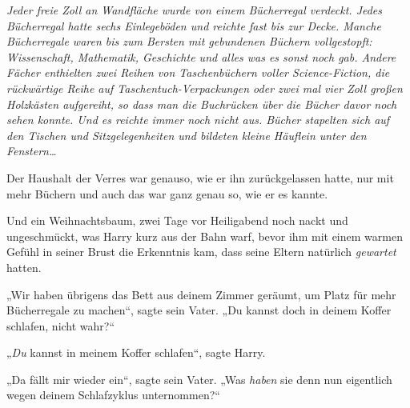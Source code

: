 \emph{Jeder freie Zoll an Wandfläche wurde von einem Bücherregal verdeckt. Jedes Bücherregal hatte sechs Einlegeböden und reichte fast bis zur Decke. Manche Bücherregale waren bis zum Bersten mit gebundenen Büchern vollgestopft: Wissenschaft, Mathematik, Geschichte und alles was es sonst noch gab. Andere Fächer enthielten zwei Reihen von Taschenbüchern voller Science-Fiction, die rückwärtige Reihe auf Taschentuch-Verpackungen oder zwei mal vier Zoll großen Holzkästen aufgereiht, so dass man die Buchrücken über die Bücher davor noch sehen konnte. Und es reichte immer noch nicht aus. Bücher stapelten sich auf den Tischen und Sitzgelegenheiten und bildeten kleine Häuflein unter den Fenstern…}

Der Haushalt der Verres war genauso, wie er ihn zurückgelassen hatte, nur mit mehr Büchern und auch das war ganz genau so, wie er es kannte.

Und ein Weihnachtsbaum, zwei Tage vor Heiligabend noch nackt und ungeschmückt, was Harry kurz aus der Bahn warf, bevor ihm mit einem warmen Gefühl in seiner Brust die Erkenntnis kam, dass seine Eltern natürlich \emph{gewartet} hatten.

„Wir haben übrigens das Bett aus deinem Zimmer geräumt, um Platz für mehr Bücherregale zu machen“, sagte sein Vater.
„Du kannst doch in deinem Koffer schlafen, nicht wahr?“

„\emph{Du} kannst in meinem Koffer schlafen“, sagte Harry.

„Da fällt mir wieder ein“, sagte sein Vater.
„Was \emph{haben} sie denn nun eigentlich wegen deinem Schlafzyklus unternommen?“

